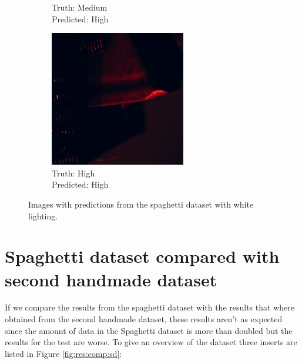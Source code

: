 \begin{figure}[hbtp]
\begin{subfigure}{.24\textwidth}
			\caption{Truth: Medium \\Predicted: High}
			\label{fig:res:sd:testimg:red:error}
		\end{subfigure}
		\hspace*{\fill}
		\begin{subfigure}{.24\textwidth}
			\centering
			\includegraphics[width=\textwidth]{fig/results/wandb/spaghetti_dataset/images/media_images_Examples_r_96_p0_t0.png}
			\caption{Truth: High \\Predicted: High}
		\end{subfigure}
		\caption{Images with predictions from the spaghetti dataset with white lighting.}
		\label{fig:res:sd:testimg:red}
	\end{figure}


\section{Spaghetti dataset compared with second handmade dataset}
\label{sec:results:spaghettivsshm}
If we compare the results from the spaghetti dataset with the results that where obtained from the second handmade dataset, these results aren't as expected since the amount of data in the Spaghetti dataset is more than doubled but the results for the test are worse. To give an overview of the dataset three inserts are listed in Figure \ref{fig:res:comp:sd}:

